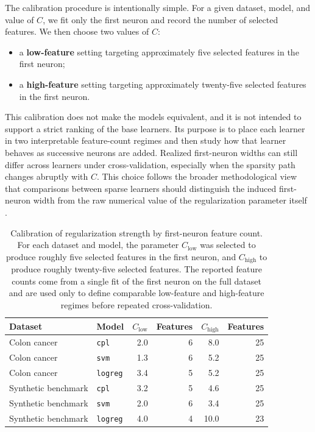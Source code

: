 The calibration procedure is intentionally simple. For a given dataset, model, and value of $C$, we fit only
the first neuron and record the number of selected features. We then choose two values of $C$:
\begin{itemize}[noitemsep]
\item a \textbf{low-feature} setting targeting approximately five selected features in the first neuron;
\item a \textbf{high-feature} setting targeting approximately twenty-five selected features in the first neuron.
\end{itemize}

This calibration does not make the models equivalent, and it is not intended to support a strict ranking of
the base learners. Its purpose is to place each learner in two interpretable feature-count regimes and then
study how that learner behaves as successive neurons are added. Realized first-neuron widths can still differ
across learners under cross-validation, especially when the sparsity path changes abruptly with $C$.
This choice follows the broader methodological view that comparisons between sparse learners should distinguish
the induced first-neuron width from the raw numerical value of the regularization parameter itself
\cite{ng2004l1l2,saeys2007review}.

\begin{table}[ht]
\centering
\begin{tabular}{llrrrr}
\toprule
Dataset & Model & $C_{\mathrm{low}}$ & Features & $C_{\mathrm{high}}$ & Features \\
\midrule
Colon cancer & \texttt{cpl} & 2.0 & 6 & 8.0 & 25 \\
Colon cancer & \texttt{svm} & 1.3 & 6 & 5.2 & 25 \\
Colon cancer & \texttt{logreg} & 3.4 & 5 & 5.2 & 25 \\
Synthetic benchmark & \texttt{cpl} & 3.2 & 5 & 4.6 & 25 \\
Synthetic benchmark & \texttt{svm} & 2.0 & 6 & 3.4 & 25 \\
Synthetic benchmark & \texttt{logreg} & 4.0 & 4 & 10.0 & 23 \\
\bottomrule
\end{tabular}
\caption{Calibration of regularization strength by first-neuron feature count. For each dataset and model, the
parameter $C_{\mathrm{low}}$ was selected to produce roughly five selected features in the first neuron, and
$C_{\mathrm{high}}$ to produce roughly twenty-five selected features. The reported feature counts come from a
single fit of the first neuron on the full dataset and are used only to define comparable low-feature and
high-feature regimes before repeated cross-validation.}
\label{tab:regularization_calibration}
\end{table}

